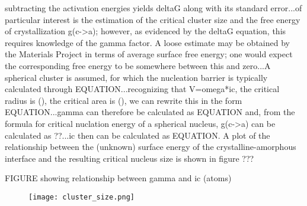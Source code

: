 subtracting the activation energies yields deltaG along with its standard error...of particular interest is the estimation of the critical cluster size and the free energy of crystallization g(c->a); however, as evidenced by the deltaG equation, this requires knowledge of the gamma factor.  A loose estimate may be obtained by the Materials Project in terms of average surface free energy; one would expect the corresponding free energy to be somewhere between this and zero...A spherical cluster is assumed, for which the nucleation barrier is typically calculated through EQUATION...recognizing that V=omega*ic, the critical radius is (), the critical area is (), we can rewrite this in the form EQUATION...gamma can therefore be calculated as EQUATION and, from the formula for critical nuclation energy of a spherical nucleus, g(c->a) can be calculated as ??...ic then can be calculated as EQUATION.  A plot of the relationship between the (unknown) surface energy of the crystalline-amorphous interface and the resulting critical nucleus size is shown in figure ???

FIGURE showing relationship between gamma and ic (atoms)

	\begin{figure}[h]
		\centering
		\texttt{[image: cluster\_size.png]}
		\caption{}
		\label{fig:cluster_size}
	\end{figure}
